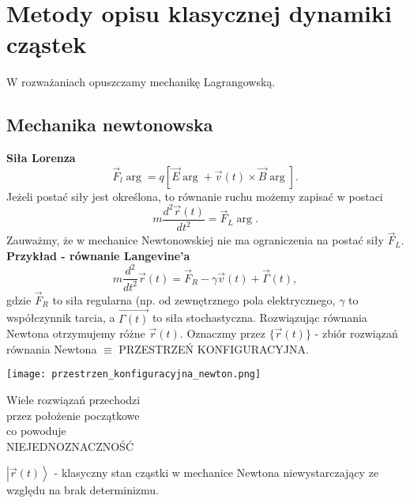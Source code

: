 \section{Metody opisu klasycznej dynamiki cząstek}
W rozważaniach opuszczamy mechanikę Lagrangowską. 
\subsection{Mechanika newtonowska}
\textbf{Siła Lorenza}
\begin{equation}\label{sila_lorenza}
	\vec{F}_l \arg = q [ \vec{E} \arg+\vec{v}(t)\times\vec{B}\arg].
\end{equation}
Jeżeli postać siły jest określona, to równanie ruchu możemy 
zapisać w postaci
\begin{equation}
	m\frac{d^2\vec{r}(t)}{dt^2}=\vec{F}_L \arg  .
\end{equation}
Zauważmy, że w mechanice Newtonowskiej nie ma ograniczenia na 
postać siły $\vec{F}_L$.
\textbf{Przykład - równanie Langevine'a}
$$ m\frac{d^2}{dt^2} \vec{r}(t) = \vec{F}_R - \gamma\vec{v}(t) +
\vec{\Gamma}(t),$$
gdzie $\vec{F}_R$ to siła regularna (np. od zewnętrznego pola 
elektrycznego, $\gamma$ to współczynnik tarcia, a $\vec{\Gamma(t)}$ 
to siła stochastyczna.
Rozwiązując równania Newtona otrzymujemy różne $\vec{r}(t)$. 
Oznaczmy przez $\{ \vec{r}(t) \}$ - zbiór rozwiązań równania Newtona
$\equiv$ PRZESTRZEŃ KONFIGURACYJNA.

\begin{minipage}{0.5\textwidth}
\texttt{[image: przestrzen\_konfiguracyjna\_newton.png]}
\end{minipage}
\begin{minipage}{0.5\textwidth}
Wiele rozwiązań przechodzi \\
przez położenie początkowe \\
co powoduje \\ NIEJEDNOZNACZNOŚĆ \vspace{2.5cm}\\
\end{minipage}

$\left|\vec{r}(t)\right> $ - klasyczny stan cząstki w mechanice Newtona 
niewystarczający ze względu na brak determinizmu.

